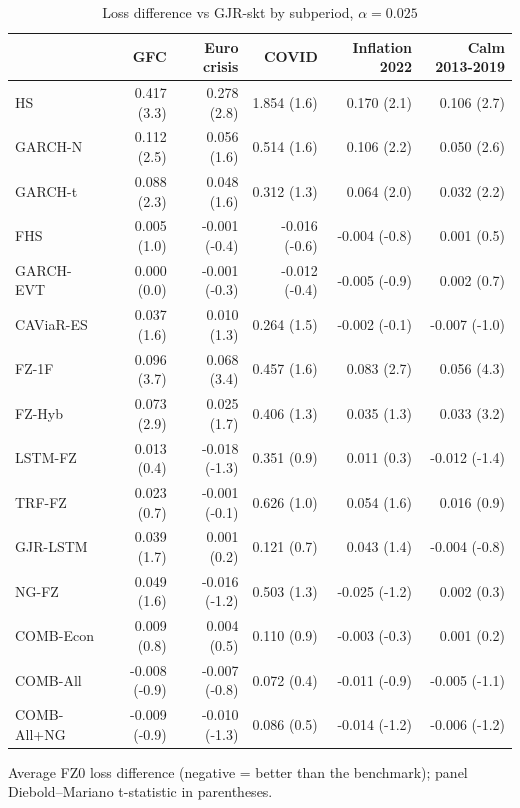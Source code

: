 \begin{table}[htbp]
\centering
\footnotesize
\caption{Loss difference vs GJR-skt by subperiod, $\alpha=0.025$}
\label{tab:sub}
\begin{tabular}{lrrrrr}
\toprule
 & GFC & Euro crisis & COVID & Inflation 2022 & Calm 2013-2019 \\
\midrule
HS & 0.417 (3.3) & 0.278 (2.8) & 1.854 (1.6) & 0.170 (2.1) & 0.106 (2.7) \\
GARCH-N & 0.112 (2.5) & 0.056 (1.6) & 0.514 (1.6) & 0.106 (2.2) & 0.050 (2.6) \\
GARCH-t & 0.088 (2.3) & 0.048 (1.6) & 0.312 (1.3) & 0.064 (2.0) & 0.032 (2.2) \\
FHS & 0.005 (1.0) & -0.001 (-0.4) & -0.016 (-0.6) & -0.004 (-0.8) & 0.001 (0.5) \\
GARCH-EVT & 0.000 (0.0) & -0.001 (-0.3) & -0.012 (-0.4) & -0.005 (-0.9) & 0.002 (0.7) \\
CAViaR-ES & 0.037 (1.6) & 0.010 (1.3) & 0.264 (1.5) & -0.002 (-0.1) & -0.007 (-1.0) \\
FZ-1F & 0.096 (3.7) & 0.068 (3.4) & 0.457 (1.6) & 0.083 (2.7) & 0.056 (4.3) \\
FZ-Hyb & 0.073 (2.9) & 0.025 (1.7) & 0.406 (1.3) & 0.035 (1.3) & 0.033 (3.2) \\
LSTM-FZ & 0.013 (0.4) & -0.018 (-1.3) & 0.351 (0.9) & 0.011 (0.3) & -0.012 (-1.4) \\
TRF-FZ & 0.023 (0.7) & -0.001 (-0.1) & 0.626 (1.0) & 0.054 (1.6) & 0.016 (0.9) \\
GJR-LSTM & 0.039 (1.7) & 0.001 (0.2) & 0.121 (0.7) & 0.043 (1.4) & -0.004 (-0.8) \\
NG-FZ & 0.049 (1.6) & -0.016 (-1.2) & 0.503 (1.3) & -0.025 (-1.2) & 0.002 (0.3) \\
COMB-Econ & 0.009 (0.8) & 0.004 (0.5) & 0.110 (0.9) & -0.003 (-0.3) & 0.001 (0.2) \\
COMB-All & -0.008 (-0.9) & -0.007 (-0.8) & 0.072 (0.4) & -0.011 (-0.9) & -0.005 (-1.1) \\
COMB-All+NG & -0.009 (-0.9) & -0.010 (-1.3) & 0.086 (0.5) & -0.014 (-1.2) & -0.006 (-1.2) \\
\bottomrule
\end{tabular}
\par\smallskip\parbox{\linewidth}{\scriptsize Average FZ0 loss difference (negative = better than the benchmark); panel Diebold--Mariano t-statistic in parentheses.}
\end{table}